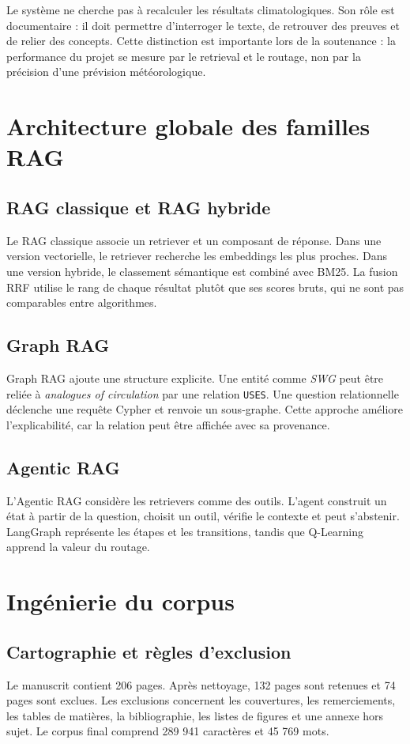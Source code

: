 \documentclass[12pt,a4paper,oneside]{report}
\newcommand{\tech}[1]{\texttt{#1}}
\begin{document}
Le système ne cherche pas à recalculer les résultats climatologiques. Son rôle est documentaire : il doit permettre d'interroger le texte, de retrouver des preuves et de relier des concepts. Cette distinction est importante lors de la soutenance : la performance du projet se mesure par le retrieval et le routage, non par la précision d'une prévision météorologique.

\section{Architecture globale des familles RAG}
\subsection{RAG classique et RAG hybride}
Le RAG classique associe un retriever et un composant de réponse. Dans une version vectorielle, le retriever recherche les embeddings les plus proches. Dans une version hybride, le classement sémantique est combiné avec BM25. La fusion RRF utilise le rang de chaque résultat plutôt que ses scores bruts, qui ne sont pas comparables entre algorithmes.

\subsection{Graph RAG}
Graph RAG ajoute une structure explicite. Une entité comme \textit{SWG} peut être reliée à \textit{analogues of circulation} par une relation \tech{USES}. Une question relationnelle déclenche une requête Cypher et renvoie un sous-graphe. Cette approche améliore l'explicabilité, car la relation peut être affichée avec sa provenance.

\subsection{Agentic RAG}
L'Agentic RAG considère les retrievers comme des outils. L'agent construit un état à partir de la question, choisit un outil, vérifie le contexte et peut s'abstenir. LangGraph représente les étapes et les transitions, tandis que Q-Learning apprend la valeur du routage.

\section{Ingénierie du corpus}
\subsection{Cartographie et règles d'exclusion}
Le manuscrit contient 206 pages. Après nettoyage, 132 pages sont retenues et 74 pages sont exclues. Les exclusions concernent les couvertures, les remerciements, les tables de matières, la bibliographie, les listes de figures et une annexe hors sujet. Le corpus final comprend 289 941 caractères et 45 769 mots.
\end{document}
